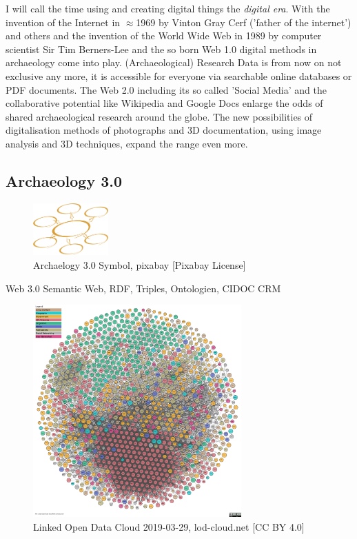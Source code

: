 \documentclass[twocolumn]{autart}
\begin{document}
I will call the time using and creating digital things the \textit{digital era}. With the invention of the Internet in $\approx$1969 by Vinton Gray Cerf ('father of the internet') and others and the invention of the World Wide Web in 1989 by computer scientist Sir Tim Berners-Lee and the so born Web 1.0 digital methods in archaeology come into play. (Archaeological) Research Data is from now on not exclusive any more, it is accessible for everyone via searchable online databases or PDF documents. The Web 2.0 including its so called 'Social Media' and the collaborative potential like Wikipedia and Google Docs enlarge the odds of shared archaeological research around the globe. The new possibilities of digitalisation methods of photographs and 3D documentation, using image analysis and 3D techniques, expand the range even more.

\subsection{Archaeology 3.0}

\begin{figure}[!htb]
\begin{center}
\includegraphics[height=2cm]{a30.png}    %
\caption{Archaelogy 3.0 Symbol, pixabay [Pixabay License]}  %
\label{figa30symbol}                                 %
\end{center}                                 %
\end{figure}

Web 3.0 Semantic Web, RDF, Triples, Ontologien, CIDOC CRM

\begin{figure}[!htb]
\begin{center}
\includegraphics[width=8cm]{lod-cloud.pdf}    %
\caption{Linked Open Data Cloud 2019-03-29, lod-cloud.net [CC BY 4.0]}  %
\label{figlodc}                                 %
\end{center}                                 %
\end{figure}
\end{document}
